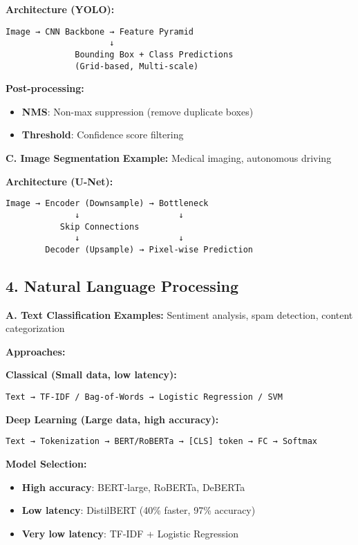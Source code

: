 \documentclass[8pt,landscape]{article}
\begin{document}
\begin{multicols}{3}
\textbf{Architecture (YOLO):}
\begin{verbatim}
Image → CNN Backbone → Feature Pyramid
                     ↓
              Bounding Box + Class Predictions
              (Grid-based, Multi-scale)
\end{verbatim}

\textbf{Post-processing:}
\begin{itemize}
\item \textbf{NMS}: Non-max suppression (remove duplicate boxes)
\item \textbf{Threshold}: Confidence score filtering
\end{itemize}

\textbf{C. Image Segmentation}
\textbf{Example:} Medical imaging, autonomous driving

\textbf{Architecture (U-Net):}
\begin{verbatim}
Image → Encoder (Downsample) → Bottleneck
              ↓                    ↓
           Skip Connections
              ↓                    ↓
        Decoder (Upsample) → Pixel-wise Prediction
\end{verbatim}

\subsection*{4. Natural Language Processing}

\textbf{A. Text Classification}
\textbf{Examples:} Sentiment analysis, spam detection, content categorization

\textbf{Approaches:}

\textbf{Classical (Small data, low latency):}
\begin{verbatim}
Text → TF-IDF / Bag-of-Words → Logistic Regression / SVM
\end{verbatim}

\textbf{Deep Learning (Large data, high accuracy):}
\begin{verbatim}
Text → Tokenization → BERT/RoBERTa → [CLS] token → FC → Softmax
\end{verbatim}

\textbf{Model Selection:}
\begin{itemize}
\item \textbf{High accuracy}: BERT-large, RoBERTa, DeBERTa
\item \textbf{Low latency}: DistilBERT (40\% faster, 97\% accuracy)
\item \textbf{Very low latency}: TF-IDF + Logistic Regression
\end{itemize}


\end{multicols}
\end{document}
